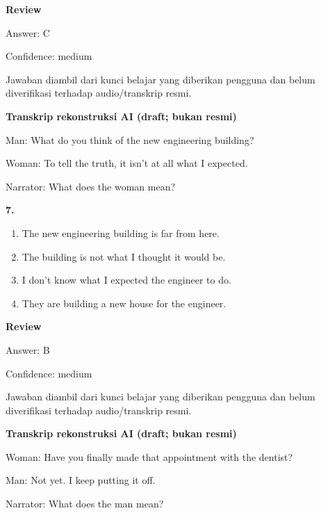 \documentclass[12pt]{article}
\begin{document}
\par
\begingroup
\setlength{\parskip}{0pt}
\setlength{\parindent}{0pt}
\textbf{Review}\par
Answer: C\par
Confidence: medium\par
Jawaban diambil dari kunci belajar yang diberikan pengguna dan belum diverifikasi terhadap audio/transkrip resmi.\par
\endgroup
\par
\vspace{0.25\baselineskip}
\begin{exampleblock}
\textbf{Transkrip rekonstruksi AI (draft; bukan resmi)}\par
Man: What do you think of the new engineering building?\par
Woman: To tell the truth, it isn't at all what I expected.\par
Narrator: What does the woman mean?\par
\end{exampleblock}
\noindent\textbf{7.}
\begin{enumerate}[label=(\Alph*),leftmargin=*,itemsep=0.2em]
\item The new engineering building is far from here.
\item The building is not what I thought it would be.
\item I don't know what I expected the engineer to do.
\item They are building a new house for the engineer.
\end{enumerate}
\par
\begingroup
\setlength{\parskip}{0pt}
\setlength{\parindent}{0pt}
\textbf{Review}\par
Answer: B\par
Confidence: medium\par
Jawaban diambil dari kunci belajar yang diberikan pengguna dan belum diverifikasi terhadap audio/transkrip resmi.\par
\endgroup
\par
\vspace{0.25\baselineskip}
\begin{exampleblock}
\textbf{Transkrip rekonstruksi AI (draft; bukan resmi)}\par
Woman: Have you finally made that appointment with the dentist?\par
Man: Not yet. I keep putting it off.\par
Narrator: What does the man mean?\par
\end{exampleblock}
\end{document}
